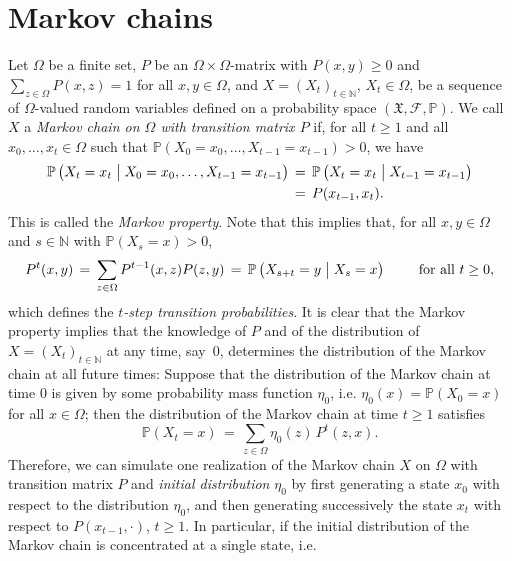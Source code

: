 \documentclass{dis}
\theoremstyle{citing}
\begin{document}
\section{Markov chains} \label{sec:2_markov}

Let ${\Omega}$ be a finite set, $P$ be an ${\Omega}\times{\Omega}$-matrix with 
$P(x,y)\ge0$ and $\sum_{z\in{\Omega}} P(x,z)=1$ for all $x,y\in{\Omega}$, 
and $X=(X_t)_{t\in{\ensuremath{\mathbb{N}}}}$, 
$X_t\in{\Omega}$, be a sequence of ${\Omega}$-valued random variables
defined on a probability space $(\mathfrak{X},\mathcal{F},{\mathbb{P}})$. 
We call $X$ a 
\emph{Markov chain on ${\Omega}$ with transition matrix $P$}
if, for all $t\ge1$ and all $x_0,\dots,x_{t}\in{\Omega}$ such 
that ${\mathbb{P}}(X_0=x_0,\dots,X_{t-1}=x_{t-1})>0$, we have 
\[\begin{split}
{\mathbb{P}}\left(X_t=x_t \bigm| X_0=x_0,\dots, X_{t-1}=x_{t-1}\right) 
\,&=\, {\mathbb{P}}\left(X_t=x_t \bigm| X_{t-1}=x_{t-1}\right) \\
&=\, P(x_{t-1},x_t).
\end{split}\]
This is called the {\it Markov property}. 
Note that this implies that, for all $x,y\in{\Omega}$ and 
$s\in{\ensuremath{\mathbb{N}}}$ with ${\mathbb{P}}(X_s=x)>0$,
\[
P^t(x,y) \,=\, \sum_{z\in{\Omega}} P^{t-1}(x,z) P(z,y) 
	\,=\, {\mathbb{P}}\left(X_{s+t}=y \bigm| X_s=x\right) 
	\qquad\text{ for all } t\ge0,
\]
which defines the \emph{$t$-step transition probabilities}.
It is clear that the Markov property implies that the knowledge 
of $P$ and of the distribution of 
$X=(X_t)_{t\in{\ensuremath{\mathbb{N}}}}$ at any time, say~0, determines the distribution 
of the Markov chain at all future times:
Suppose that the distribution of the Markov chain at time $0$ is 
given by some probability mass function $\eta_0$, 
i.e. $\eta_0(x)={\mathbb{P}}(X_0=x)$ for all $x\in{\Omega}$; then the 
distribution of the Markov chain at time $t\ge1$ satisfies
\begin{equation} \label{eq:P-X_t}
{\mathbb{P}}(X_t=x) \,=\, \sum_{z\in{\Omega}} \eta_0(z)\, P^t(z,x).
\end{equation}
Therefore, we can simulate one realization of the Markov chain $X$ 
on ${\Omega}$ with transition matrix $P$ and \emph{initial distribution}
$\eta_0$ 
by first generating a state $x_0$ with respect to the distribution 
$\eta_0$, and then generating successively the state $x_t$ with 
respect to $P(x_{t-1},\cdot)$, $t\ge1$.
In particular, if the initial distribution of the Markov 
chain is concentrated at a single state, i.e. 
\end{document}
